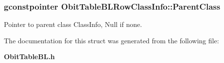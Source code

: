 \subsubsection{\setlength{\rightskip}{0pt plus 5cm}gconstpointer {\bf Obit\-Table\-BLRow\-Class\-Info::Parent\-Class}}\label{structObitTableBLRowClassInfo_o3}


Pointer to parent class Class\-Info, Null if none. 



The documentation for this struct was generated from the following file:\begin{CompactItemize}
\item 
{\bf Obit\-Table\-BL.h}\end{CompactItemize}
